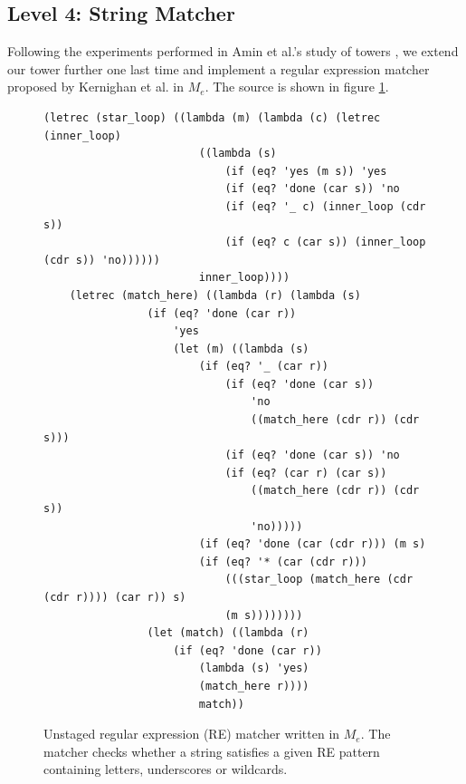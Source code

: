 \documentclass[a4paper,12pt,twoside,openright]{report}
\theoremstyle{definition}
\newcommand{\mevl}{$M_{e}$}
\begin{document}

\subsection{Level 4: String Matcher}\label{sec:string_matcher}

Following the experiments performed in Amin et al.'s study of towers \cite{amin2017collapsing}, we extend our tower further one last time and implement a regular expression matcher proposed by Kernighan et al. \cite{kernighan2007regular} in \mevl. The source is shown in figure \ref{lst:regexp}.

\begin{figure}[htp!]
    \centering
    \begin{verbatim}
(letrec (star_loop) ((lambda (m) (lambda (c) (letrec (inner_loop)
                        ((lambda (s)
                            (if (eq? 'yes (m s)) 'yes
                            (if (eq? 'done (car s)) 'no
                            (if (eq? '_ c) (inner_loop (cdr s))
                            (if (eq? c (car s)) (inner_loop (cdr s)) 'no))))))
                        inner_loop))))
    (letrec (match_here) ((lambda (r) (lambda (s)
                (if (eq? 'done (car r))
                    'yes
                    (let (m) ((lambda (s)
                        (if (eq? '_ (car r))
                            (if (eq? 'done (car s))
                                'no
                                ((match_here (cdr r)) (cdr s)))
                            (if (eq? 'done (car s)) 'no
                            (if (eq? (car r) (car s))
                                ((match_here (cdr r)) (cdr s))
                                'no)))))
                        (if (eq? 'done (car (cdr r))) (m s)
                        (if (eq? '* (car (cdr r)))
                            (((star_loop (match_here (cdr (cdr r)))) (car r)) s)
                            (m s))))))))
                (let (match) ((lambda (r)
                    (if (eq? 'done (car r))
                        (lambda (s) 'yes)
                        (match_here r))))
                        match))
    \end{verbatim}
    \caption{Unstaged regular expression (RE) matcher written in \mevl. The matcher checks whether a string satisfies a given RE pattern containing letters, underscores or wildcards.}
    \label{lst:regexp}
\end{figure}
\end{document}
